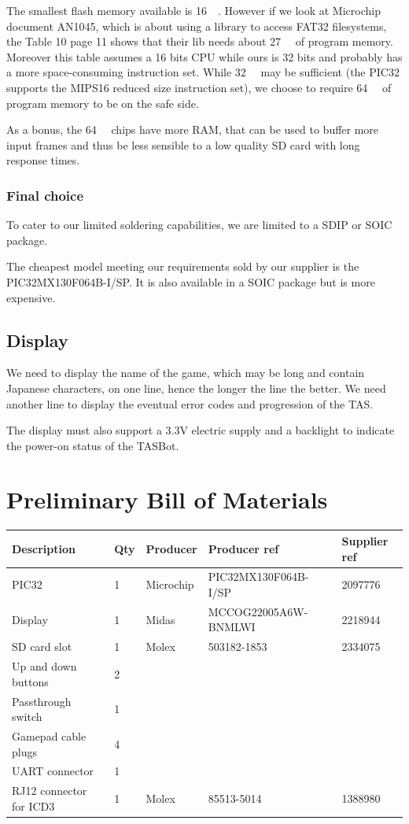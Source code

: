 \documentclass[a4paper,oneside,12pt]{article}
\begin{document}
The smallest flash memory available is \SI{16}{\kibi\byte}. However if we look
at Microchip document AN1045, which is about using a library to access FAT32
filesystems, the Table 10 page 11 shows that their lib needs about
\SI{27}{\kibi\byte} of program memory. Moreover this table assumes a 16 bits CPU
while ours is 32 bits and probably has a more space-consuming instruction
set. While \SI{32}{\kibi\byte} may be sufficient (the PIC32 supports the MIPS16
reduced size instruction set), we choose to require \SI{64}{\kibi\byte} of
program memory to be on the safe side.

As a bonus, the \SI{64}{\kibi\byte} chips have more RAM, that can be used to
buffer more input frames and thus be less sensible to a low quality SD card with
long response times.

\subsubsection{Final choice}

To cater to our limited soldering capabilities, we are limited to a SDIP or
SOIC package.

The cheapest model meeting our requirements sold by our supplier is the
PIC32MX130F064B-I/SP. It is also available in a SOIC package but is more
expensive.

\subsection{Display}
We need to display the name of the game, which may be long and contain Japanese
characters, on one line, hence the longer the line the better. We need another
line to display the eventual error codes and progression of the TAS.

The display must also support a 3.3V electric supply and a backlight to indicate
the power-on status of the TASBot.

\section{Preliminary Bill of Materials}
\begin{tabular}{|l|l|l|l|l|}
  \hline
  Description & Qty & Producer & Producer ref & Supplier ref \\
  \hline
  PIC32 & 1 & Microchip & PIC32MX130F064B-I/SP & 2097776 \\
  \hline
  Display & 1 & Midas & MCCOG22005A6W-BNMLWI & 2218944 \\
  \hline
  SD card slot & 1 & Molex & 503182-1853 & 2334075 \\
  \hline
  Up and down buttons & 2 & & &\\
  \hline
  Passthrough switch & 1 & & &\\
  \hline
  Gamepad cable plugs & 4 & & &\\
  \hline
  UART connector & 1 & & &\\
  \hline
  RJ12 connector for ICD3 & 1 & Molex & 85513-5014 & 1388980 \\
  \hline
\end{tabular}
\end{document}
